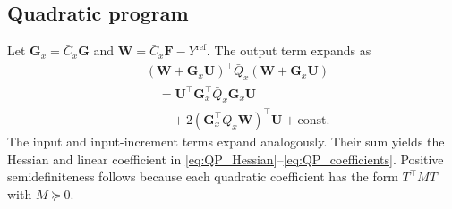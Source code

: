 \documentclass[journal]{IEEEtran}
\newcommand{\mF}{\mathbf{F}}
\newcommand{\mG}{\mathbf{G}}
\newcommand{\mU}{\mathbf{U}}
\newcommand{\mW}{\mathbf{W}}
\begin{document}
\subsection*{Quadratic program}
Let $\mG_x=\bar C_x\mG$ and $\mW=\bar C_x\mF-Y^{\mathrm{ref}}$. The output term expands as
\begin{equation}
    \begin{aligned}
    &(\mW+\mG_x\mU)^\top\bar Q_x(\mW+\mG_x\mU)\\
    &\quad=\mU^\top\mG_x^\top\bar Q_x\mG_x\mU\\
    &\qquad+2(\mG_x^\top\bar Q_x\mW)^\top\mU+\mathrm{const}.
    \end{aligned}
\end{equation}
The input and input-increment terms expand analogously. Their sum yields the Hessian and linear coefficient in \eqref{eq:QP_Hessian}--\eqref{eq:QP_coefficients}. Positive semidefiniteness follows because each quadratic coefficient has the form $T^\top MT$ with $M\succeq0$.
\end{document}
